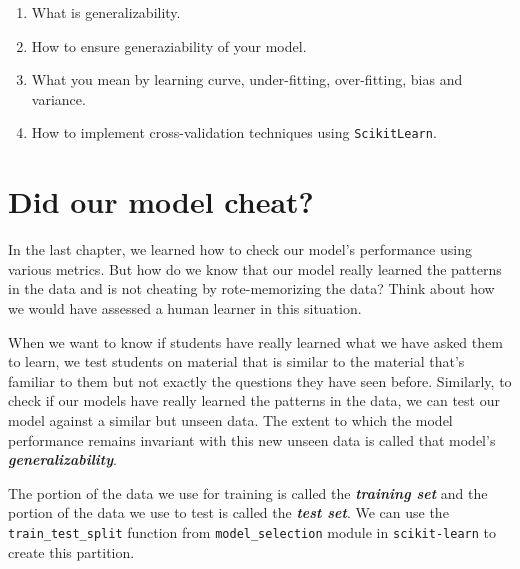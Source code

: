 \documentclass[
  letterpaper,
]{book}
\providecommand{\tightlist}{%
  \setlength{\itemsep}{0pt}\setlength{\parskip}{0pt}}\usepackage{longtable,booktabs,array}
\begin{document}
\begin{tcolorbox}[standard jigsaw,bottomtitle=1mm, titlerule=0mm, title={In this chapter you'll learn:}, leftrule=.75mm, toptitle=1mm, arc=.35mm, rightrule=.15mm, opacitybacktitle=0.6, colframe=quarto-callout-caution-color-frame, bottomrule=.15mm, colbacktitle=quarto-callout-caution-color!10!white, colback=white, toprule=.15mm, left=2mm, coltitle=black, opacityback=0]

\begin{enumerate}
\def\labelenumi{\arabic{enumi}.}
\tightlist
\item
  What is generalizability.
\item
  How to ensure generaziability of your model.
\item
  What you mean by learning curve, under-fitting, over-fitting, bias and
  variance.
\item
  How to implement cross-validation techniques using
  \texttt{ScikitLearn}.
\end{enumerate}

\end{tcolorbox}

\hypertarget{did-our-model-cheat}{%
\section{Did our model cheat?}\label{did-our-model-cheat}}

In the last chapter, we learned how to check our model's performance
using various metrics. But how do we know that our model really learned
the patterns in the data and is not cheating by rote-memorizing the
data? Think about how we would have assessed a human learner in this
situation.

When we want to know if students have really learned what we have asked
them to learn, we test students on material that is similar to the
material that's familiar to them but not exactly the questions they have
seen before. Similarly, to check if our models have really learned the
patterns in the data, we can test our model against a similar but unseen
data. The extent to which the model performance remains invariant with
this new unseen data is called that model's
\textbf{\emph{generalizability}}.

The portion of the data we use for training is called the
\textbf{\emph{training set}} and the portion of the data we use to test
is called the \textbf{\emph{test set}}. We can use the
\texttt{train\_test\_split} function from \texttt{model\_selection}
module in \texttt{scikit-learn} to create this partition.
\end{document}
